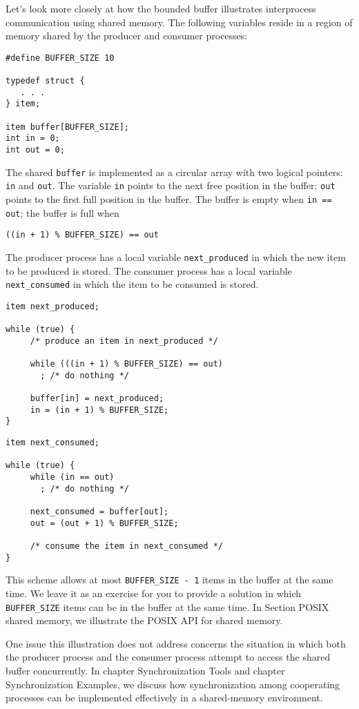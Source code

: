 Let's look more closely at how the bounded buffer illustrates interprocess communication using shared memory. The following variables reside in a region of memory shared by the producer and consumer processes:
\begin{verbatim}
#define BUFFER_SIZE 10
 
typedef struct {
   . . .
} item;
 
item buffer[BUFFER_SIZE];
int in = 0;
int out = 0;
\end{verbatim}
The shared \texttt{buffer} is implemented as a circular array with two logical pointers: \texttt{in} and \texttt{out}. The variable \texttt{in} points to the next free position in the buffer; \texttt{out} points to the first full position in the buffer. The buffer is empty when \texttt{in == out}; the buffer is full when
\begin{verbatim}
((in + 1) % BUFFER_SIZE) == out
\end{verbatim}

The producer process has a local variable \texttt{next\_produced} in which the new item to be produced is stored. The consumer process has a local variable \texttt{next\_consumed} in which the item to be consumed is stored.
\begin{verbatim}
item next_produced;
 
while (true) {
     /* produce an item in next_produced */
 
     while (((in + 1) % BUFFER_SIZE) == out)
       ; /* do nothing */
 
     buffer[in] = next_produced;
     in = (in + 1) % BUFFER_SIZE;
}
\end{verbatim}
\begin{verbatim}
item next_consumed;
 
while (true) {
     while (in == out)
       ; /* do nothing */
 
     next_consumed = buffer[out];
     out = (out + 1) % BUFFER_SIZE;
 
     /* consume the item in next_consumed */
}
\end{verbatim}
This scheme allows at most \texttt{BUFFER\_SIZE - 1} items in the buffer at the same time. We leave it as an exercise for you to provide a solution in which \texttt{BUFFER\_SIZE} items can be in the buffer at the same time. In Section POSIX shared memory, we illustrate the POSIX API for shared memory.

One issue this illustration does not address concerns the situation in which both the producer process and the consumer process attempt to access the shared buffer concurrently. In chapter Synchronization Tools and chapter Synchronization Examples, we discuss how synchronization among cooperating processes can be implemented effectively in a shared-memory environment.


